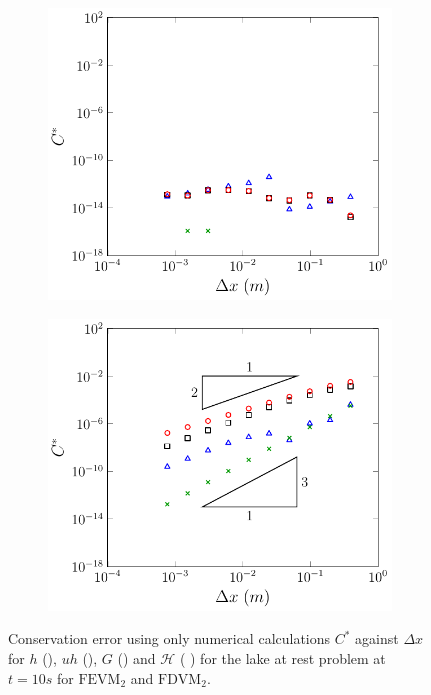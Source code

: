 \begin{figure}
\begin{subfigure}{0.5\textwidth}
		\vspace{0.5cm}
	\end{subfigure}
	\begin{subfigure}{0.5\textwidth}
		\includegraphics[width=\textwidth]{./chp5/figures/Analytic/LakeAtRest/C1/Num/FDVM2WB.pdf}
	\end{subfigure}%
	\begin{subfigure}{0.5\textwidth}
		\includegraphics[width=\textwidth]{./chp5/figures/Analytic/LakeAtRest/C1/Num/FDVM2nWB.pdf}
	\end{subfigure}
	\caption{Conservation error using only numerical calculations $C^*$ against $\Delta x$ for $h$ (), $uh$ (), $G$ () and $\mathcal{H}$ ({\color{green!60!black} }) for the lake at rest problem at $t=10s$ for $\text{FEVM}_2$ and $\text{FDVM}_2$.}
	\label{fig:LakeAtRestEC*1}
\end{figure} 

